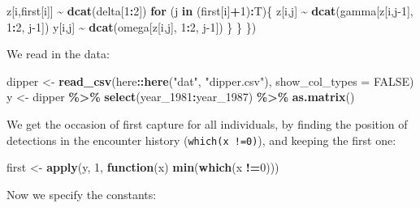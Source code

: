 \documentclass[
  12pt,
]{krantz}
\newenvironment{Shaded}{\begin{snugshade}}{\end{snugshade}}
\newcommand{\AttributeTok}[1]{\textcolor[rgb]{0.13,0.29,0.53}{#1}}
\newcommand{\ConstantTok}[1]{\textcolor[rgb]{0.56,0.35,0.01}{#1}}
\newcommand{\ControlFlowTok}[1]{\textcolor[rgb]{0.13,0.29,0.53}{\textbf{#1}}}
\newcommand{\DecValTok}[1]{\textcolor[rgb]{0.00,0.00,0.81}{#1}}
\newcommand{\FunctionTok}[1]{\textcolor[rgb]{0.13,0.29,0.53}{\textbf{#1}}}
\newcommand{\NormalTok}[1]{#1}
\newcommand{\OtherTok}[1]{\textcolor[rgb]{0.56,0.35,0.01}{#1}}
\newcommand{\SpecialCharTok}[1]{\textcolor[rgb]{0.81,0.36,0.00}{\textbf{#1}}}
\newcommand{\StringTok}[1]{\textcolor[rgb]{0.31,0.60,0.02}{#1}}
\begin{document}
\begin{Shaded}
\begin{Highlighting}[]
\NormalTok{    z[i,first[i]] }\SpecialCharTok{\textasciitilde{}} \FunctionTok{dcat}\NormalTok{(delta[}\DecValTok{1}\SpecialCharTok{:}\DecValTok{2}\NormalTok{])}
    \ControlFlowTok{for}\NormalTok{ (j }\ControlFlowTok{in}\NormalTok{ (first[i]}\SpecialCharTok{+}\DecValTok{1}\NormalTok{)}\SpecialCharTok{:}\NormalTok{T)\{}
\NormalTok{      z[i,j] }\SpecialCharTok{\textasciitilde{}} \FunctionTok{dcat}\NormalTok{(gamma[z[i,j}\DecValTok{{-}1}\NormalTok{], }\DecValTok{1}\SpecialCharTok{:}\DecValTok{2}\NormalTok{, j}\DecValTok{{-}1}\NormalTok{])}
\NormalTok{      y[i,j] }\SpecialCharTok{\textasciitilde{}} \FunctionTok{dcat}\NormalTok{(omega[z[i,j], }\DecValTok{1}\SpecialCharTok{:}\DecValTok{2}\NormalTok{, j}\DecValTok{{-}1}\NormalTok{])}
\NormalTok{    \}}
\NormalTok{  \}}
\NormalTok{\})}
\end{Highlighting}
\end{Shaded}

We read in the data:

\begin{Shaded}
\begin{Highlighting}[]
\NormalTok{dipper }\OtherTok{\textless{}{-}} \FunctionTok{read\_csv}\NormalTok{(here}\SpecialCharTok{::}\FunctionTok{here}\NormalTok{(}\StringTok{"dat"}\NormalTok{, }\StringTok{"dipper.csv"}\NormalTok{), }\AttributeTok{show\_col\_types =} \ConstantTok{FALSE}\NormalTok{)}
\NormalTok{y }\OtherTok{\textless{}{-}}\NormalTok{ dipper }\SpecialCharTok{\%\textgreater{}\%}
  \FunctionTok{select}\NormalTok{(year\_1981}\SpecialCharTok{:}\NormalTok{year\_1987) }\SpecialCharTok{\%\textgreater{}\%}
  \FunctionTok{as.matrix}\NormalTok{()}
\end{Highlighting}
\end{Shaded}

We get the occasion of first capture for all individuals, by finding the position of detections in the encounter history (\texttt{which(x\ !=0)}), and keeping the first one:

\begin{Shaded}
\begin{Highlighting}[]
\NormalTok{first }\OtherTok{\textless{}{-}} \FunctionTok{apply}\NormalTok{(y, }\DecValTok{1}\NormalTok{, }\ControlFlowTok{function}\NormalTok{(x) }\FunctionTok{min}\NormalTok{(}\FunctionTok{which}\NormalTok{(x }\SpecialCharTok{!=}\DecValTok{0}\NormalTok{)))}
\end{Highlighting}
\end{Shaded}

Now we specify the constants:
\end{document}

